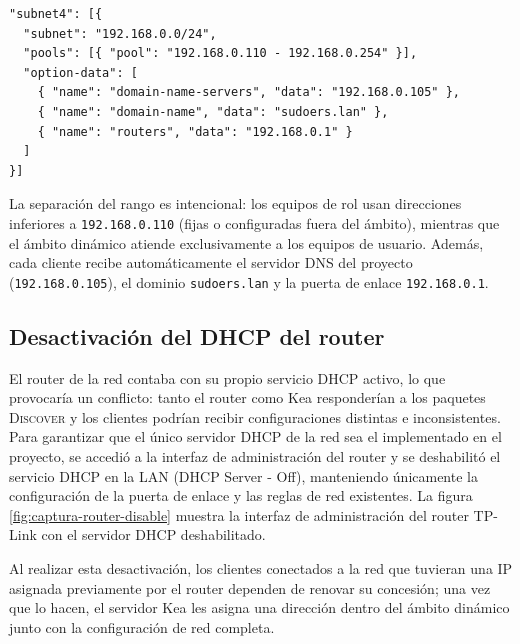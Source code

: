 \begin{lstlisting}[style=terminal]
"subnet4": [{
  "subnet": "192.168.0.0/24",
  "pools": [{ "pool": "192.168.0.110 - 192.168.0.254" }],
  "option-data": [
    { "name": "domain-name-servers", "data": "192.168.0.105" },
    { "name": "domain-name", "data": "sudoers.lan" },
    { "name": "routers", "data": "192.168.0.1" }
  ]
}]
\end{lstlisting}

La separación del rango es intencional: los equipos de rol usan direcciones
inferiores a \texttt{192.168.0.110} (fijas o configuradas fuera del ámbito),
mientras que el ámbito dinámico atiende exclusivamente a los equipos de
usuario. Además, cada cliente recibe automáticamente el servidor DNS del
proyecto (\texttt{192.168.0.105}), el dominio \texttt{sudoers.lan} y la
puerta de enlace \texttt{192.168.0.1}.

\subsection{Desactivación del DHCP del router}

El router de la red contaba con su propio servicio DHCP activo, lo que
provocaría un conflicto: tanto el router como Kea responderían a los
paquetes \textsc{Discover} y los clientes podrían recibir configuraciones
distintas e inconsistentes. Para garantizar que el único servidor DHCP de la
red sea el implementado en el proyecto, se accedió a la interfaz de
administración del router y se deshabilitó el servicio DHCP en la LAN
(DHCP Server - Off), manteniendo únicamente la configuración de la puerta de
enlace y las reglas de red existentes. La figura \ref{fig:captura-router-disable}
muestra la interfaz de administración del router TP-Link con el servidor DHCP
deshabilitado.


Al realizar esta desactivación, los clientes conectados a la red que tuvieran
una IP asignada previamente por el router dependen de renovar su concesión;
una vez que lo hacen, el servidor Kea les asigna una dirección dentro del
ámbito dinámico junto con la configuración de red completa.


